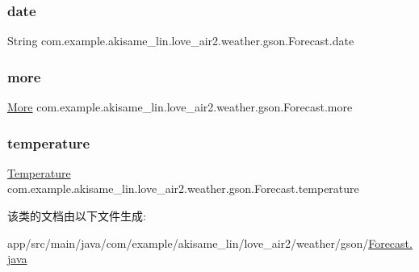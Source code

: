 \subsubsection{\texorpdfstring{date}{date}}
{\footnotesize\ttfamily String com.\+example.\+akisame\+\_\+lin.\+love\+\_\+air2.\+weather.\+gson.\+Forecast.\+date}

\mbox{\label{classcom_1_1example_1_1akisame__lin_1_1love__air2_1_1weather_1_1gson_1_1_forecast_afb279bf0c7a9a5cde770da000a658ce2}} 
\subsubsection{\texorpdfstring{more}{more}}
{\footnotesize\ttfamily \mbox{\hyperlink{classcom_1_1example_1_1akisame__lin_1_1love__air2_1_1weather_1_1gson_1_1_forecast_1_1_more}{More}} com.\+example.\+akisame\+\_\+lin.\+love\+\_\+air2.\+weather.\+gson.\+Forecast.\+more}

\mbox{\label{classcom_1_1example_1_1akisame__lin_1_1love__air2_1_1weather_1_1gson_1_1_forecast_a0f3dab78555346c13bf90a1e0e5d1f25}} 
\subsubsection{\texorpdfstring{temperature}{temperature}}
{\footnotesize\ttfamily \mbox{\hyperlink{classcom_1_1example_1_1akisame__lin_1_1love__air2_1_1weather_1_1gson_1_1_forecast_1_1_temperature}{Temperature}} com.\+example.\+akisame\+\_\+lin.\+love\+\_\+air2.\+weather.\+gson.\+Forecast.\+temperature}



该类的文档由以下文件生成\+:\begin{DoxyCompactItemize}
\item 
app/src/main/java/com/example/akisame\+\_\+lin/love\+\_\+air2/weather/gson/\mbox{\hyperlink{java_2com_2example_2akisame__lin_2love__air2_2weather_2gson_2_forecast_8java}{Forecast.\+java}}\end{DoxyCompactItemize}
